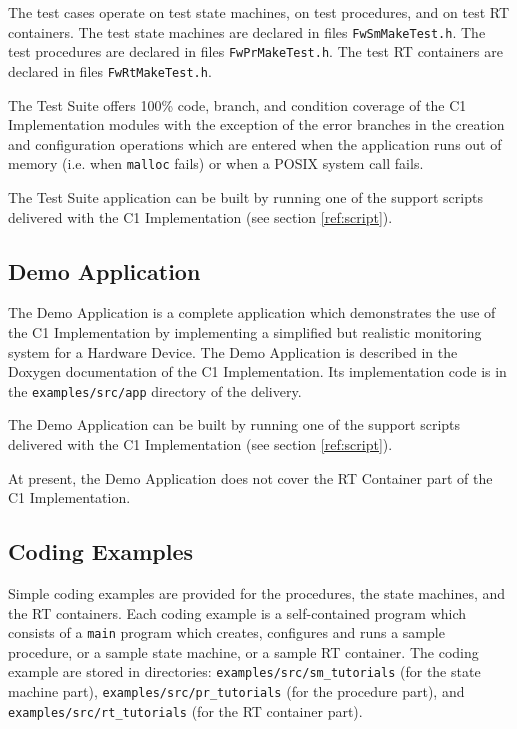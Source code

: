 \documentclass[a4paper,10pt]{article}
\begin{document}
The test cases operate on test state machines, on test procedures, and on test RT containers. 
The test state machines are declared in files \texttt{FwSmMakeTest.h}. 
The test procedures are declared in files \texttt{FwPrMakeTest.h}.
The test RT containers are declared in files \texttt{FwRtMakeTest.h}.

The Test Suite offers 100\% code, branch, and condition coverage of the C1 Implementation modules with the exception of the error branches in the creation and configuration operations which are entered when the application runs out of memory (i.e. when \texttt{malloc} fails) or when a POSIX system call fails.

The Test Suite application can be built by running one of the support scripts delivered with the C1 Implementation (see section \ref{ref:script}). 

\subsection{Demo Application}\label{sec:demoApp}
The Demo Application is a complete application which demonstrates the use of the C1 Implementation by implementing a simplified but realistic monitoring system for a Hardware Device. The Demo Application is described in the Doxygen documentation of the C1 Implementation. Its implementation code is in the \texttt{examples/src/app} directory of the delivery.

The Demo Application can be built by running one of the support scripts delivered with the C1 Implementation (see section \ref{ref:script}). 

At present, the Demo Application does not cover the RT Container part of the C1 Implementation.

\subsection{Coding Examples}\label{sec:codingExamples}
Simple coding examples are provided for the procedures, the state machines, and the RT containers. Each coding example is a self-contained program which consists of a \texttt{main} program which creates, configures and runs a sample procedure, or a sample state machine, or a sample RT container. The coding example are stored in directories: \texttt{examples/src/sm\_tutorials} (for the state machine part), \texttt{examples/src/pr\_tutorials} (for the procedure part), and \texttt{examples/src/rt\_tutorials} (for the RT container part).
\end{document}
